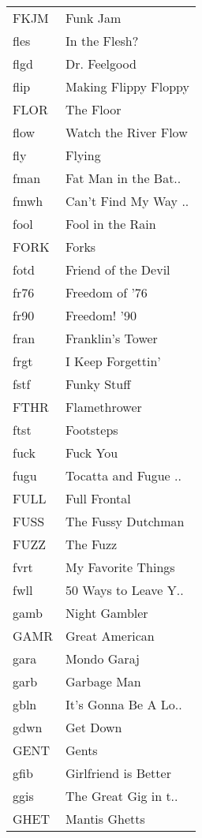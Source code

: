 \begin{supertabular}{ll}
 FKJM &              Funk Jam \\
 fles &         In the Flesh? \\
 flgd &          Dr. Feelgood \\
 flip &  Making Flippy Floppy \\
 FLOR &             The Floor \\
 flow &  Watch the River Flow \\
  fly &                Flying \\
 fman &  Fat Man in the Bat.. \\
 fmwh &  Can't Find My Way .. \\
 fool &      Fool in the Rain \\
 FORK &                 Forks \\
 fotd &   Friend of the Devil \\
 fr76 &        Freedom of '76 \\
 fr90 &          Freedom! '90 \\
 fran &      Franklin's Tower \\
 frgt &     I Keep Forgettin' \\
 fstf &           Funky Stuff \\
 FTHR &          Flamethrower \\
 ftst &             Footsteps \\
 fuck &              Fuck You \\
 fugu &  Tocatta and Fugue .. \\
 FULL &          Full Frontal \\
 FUSS &    The Fussy Dutchman \\
 FUZZ &              The Fuzz \\
 fvrt &    My Favorite Things \\
 fwll &  50 Ways to Leave Y.. \\
 gamb &         Night Gambler \\
 GAMR &        Great American \\
 gara &           Mondo Garaj \\
 garb &           Garbage Man \\
 gbln &  It's Gonna Be A Lo.. \\
 gdwn &              Get Down \\
 GENT &                 Gents \\
 gfib &  Girlfriend is Better \\
 ggis &  The Great Gig in t.. \\
 GHET &         Mantis Ghetts \\

\end{supertabular}
